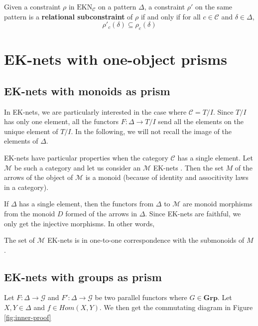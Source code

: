 \begin{defn}
    Given a constraint $\rho$ in $\text{EKN}_\mathcal{C}$ on a pattern $\Delta$, a constraint $\rho'$ on the same pattern is a \textbf{relational subconstraint} of $\rho$ if and only if for all $c\in \mathcal{C}$ and $\delta\in\Delta$,
    $$\rho'_c(\delta)\subseteq\rho_c(\delta)$$
\end{defn}




\section{EK-nets with one-object prisms}

\subsection{EK-nets with monoids as prism}
In EK-nets, we are particularly interested in the case where $\mathcal{C} = T/I$. Since $T/I$ has only one element, all the functors $F:\Delta \rightarrow T/I$ send all the elements on the unique element of $T/I$. In the following, we will not recall the image of the elements of $\Delta$.

EK-nets have particular properties when the category $\mathcal{C}$ has a single element. Let $\mathcal{M}$ be such a category and let us consider  an $\mathcal{M}$ EK-nets . Then the set $M$ of the arrows of the object of $\mathcal{M}$ is a monoid (because of identity and associtivity laws in a category).

If $\Delta$ has a single element, then the functors from $\Delta$ to $\mathcal{M}$ are monoid morphisms from the monoid $D$ formed of the arrows in $\Delta$. Since EK-nets are faithful, we only get the injective morphisms. In other words, 

\begin{prop}
    \label{prop:submon}
    The set of $\mathcal{M}$ EK-nets is in one-to-one correspondence with the submonoids of $M$.
\end{prop}

\subsection{EK-nets with groups as prism}

Let $F:\Delta\rightarrow \mathcal{G}$ and $F':\Delta\rightarrow \mathcal{G}$ be two parallel functors where $G\in \textbf{Grp}$. Let $X,Y\in\Delta$ and $f\in Hom(X,Y)$. We then get the commutating diagram in Figure \ref{fig:inner-proof}

